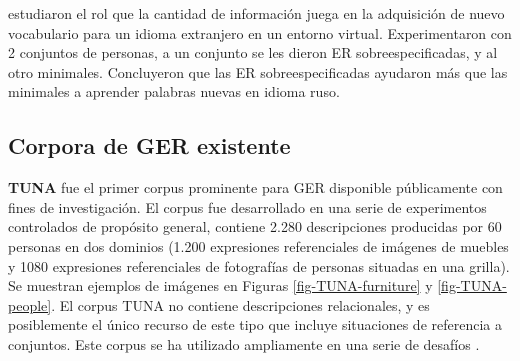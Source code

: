 \cite{Lu_sasha2015} estudiaron el rol que la cantidad de informaci\'on juega en la adquisici\'on de nuevo vocabulario para un idioma extranjero en un entorno virtual. Experimentaron con 2 conjuntos de personas, a un conjunto se les dieron ER sobreespecificadas, y al otro minimales. Concluyeron que las ER sobreespecificadas ayudaron m\'as que las minimales a aprender palabras nuevas en idioma ruso.

\subsection{Corpora de GER existente}
\label{sec:corpus2}
\label{sec:corpusTUNA}


{\bf TUNA} \cite{tuna-corpus} fue el primer corpus prominente para GER disponible p\'ublicamente con fines de investigaci\'on. El corpus fue desarrollado en una serie de experimentos controlados de prop\'osito general, contiene 2.280 descripciones producidas por 60 personas en dos dominios (1.200 expresiones referenciales de im\'agenes de muebles y 1080 expresiones referenciales de fotograf\'ias de personas situadas en una grilla). Se muestran ejemplos de im\'agenes en Figuras \ref{fig-TUNA-furniture} y \ref{fig-TUNA-people}. El corpus TUNA no contiene descripciones relacionales, y es posiblemente el \'unico recurso de este tipo que incluye situaciones de referencia a conjuntos. Este corpus se ha utilizado ampliamente en una serie de desaf\'ios \cite{reg2009}. 

